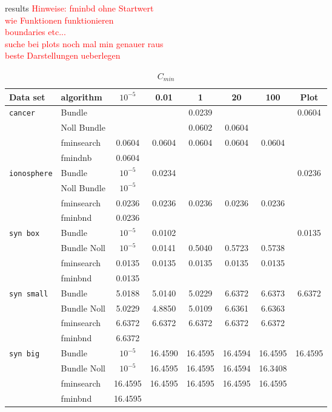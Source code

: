 results
\textcolor{red}{Hinweise: fminbd ohne Startwert\\
wie Funktionen funktionieren\\
boundaries etc...\\
suche bei plots noch mal min genauer raus \\
beste Darstellungen ueberlegen}


\begin{center}
\begin{table}[H]%
	\begin{tabular}{|l|l|c|c|c|c|c|c|}
		\hline
    Data set & algorithm & \(10^{-5}\) & 0.01 & 1 & 20 & 100 & Plot \\
		\hline
		\texttt{cancer} & Bundle &  & & 0.0239 & & & 0.0604\\
		 & Noll Bundle &  & & 0.0602 & 0.0604 &&\\
		 &  fminsearch &  0.0604 & 0.0604 & 0.0604 & 0.0604 & 0.0604&\\
		 & fmindnb & 0.0604 &&&&&\\
		\hline
		\texttt{ionosphere} & Bundle & \(10^{-5}\)& 0.0234 & &  & & 0.0236 \\
		 & Noll Bundle & \(10^{-5}\) &&&&& \\
		 & fminsearch & 0.0236 & 0.0236 & 0.0236 & 0.0236 & 0.0236&\\
		 & fminbnd &  0.0236&&&&&\\
		\hline
		\texttt{syn box} & Bundle & \(10^{-5}\) & 0.0102 & & & & 0.0135 \\
		 & Bundle Noll & \(10^{-5}\) & 0.0141 & 0.5040 & 0.5723 & 0.5738&\\
		 & fminsearch & 0.0135 & 0.0135 & 0.0135 & 0.0135 & 0.0135&\\
		 & fminbnd & 0.0135 &&&&& \\
		\hline
		\texttt{syn small} & Bundle & 5.0188 & 5.0140 & 5.0229 & 6.6372 & 6.6373 & 6.6372 \\
		 & Bundle Noll & 5.0229 & 4.8850 & 5.0109 & 6.6361 & 6.6363&\\
		 & fminsearch & 6.6372 & 6.6372 & 6.6372 & 6.6372 & 6.6372 &\\
		 & fminbnd &  6.6372&&&&&\\
		\hline
		\texttt{syn big} & Bundle & \(10^{-5}\) & 16.4590 & 16.4595 & 16.4594 & 16.4595 & 16.4595 \\
		 & Bundle Noll &  \(10^{-5}\) & 16.4595 & 16.4595 & 16.4594 & 16.3408&\\
		 & fminsearch &  16.4595 & 16.4595 & 16.4595 & 16.4595 & 16.4595 &\\
		 & fminbnd & 16.4595&&&&&\\
		\hline
	\end{tabular}
	\caption{\(C_{min}\)}
\end{table}
\end{center}

